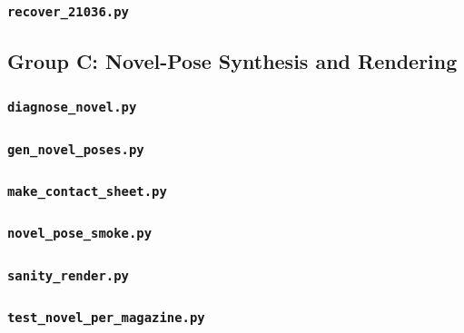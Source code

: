 \documentclass[12pt]{article}
\begin{document}
\subsubsection{\texttt{recover\_21036.py}}


\subsection{Group C: Novel-Pose Synthesis and Rendering}

\subsubsection{\texttt{diagnose\_novel.py}}


\subsubsection{\texttt{gen\_novel\_poses.py}}


\subsubsection{\texttt{make\_contact\_sheet.py}}


\subsubsection{\texttt{novel\_pose\_smoke.py}}


\subsubsection{\texttt{sanity\_render.py}}


\subsubsection{\texttt{test\_novel\_per\_magazine.py}}

\end{document}
